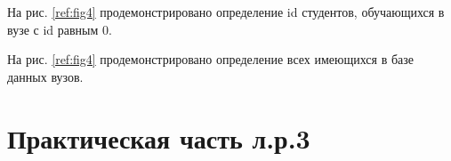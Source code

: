 \documentclass[a4paper,oneside,12pt]{extreport}
\begin{document}
\begin{task}
    На рис. \ref{ref:fig4} продемонстрировано определение id студентов,
    обучающихся в вузе с id равным 0.

    \begin{figure}[ht!]
    \end{figure}

    На рис. \ref{ref:fig4} продемонстрировано определение 
    всех имеющихся в базе данных вузов.     

    \begin{figure}[ht!]
    \end{figure}

\end{task}

\section*{Практическая часть л.р.3}
\end{document}
